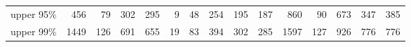 \begin{tabular}{lrrrrrrrrrrrrrr}
upper 95\% &                  456 &                    79 &                        302 &                      295 &                    9 &                    48 &                       254 &                        195 &                      187 &                  860 &                    90 &                       673 &                        347 &                      385 \\
upper 99\% &                 1449 &                   126 &                        691 &                      655 &                   19 &                    83 &                       394 &                        302 &                      285 &                 1597 &                   127 &                       926 &                        776 &                      776 \\
\bottomrule
\end{tabular}
